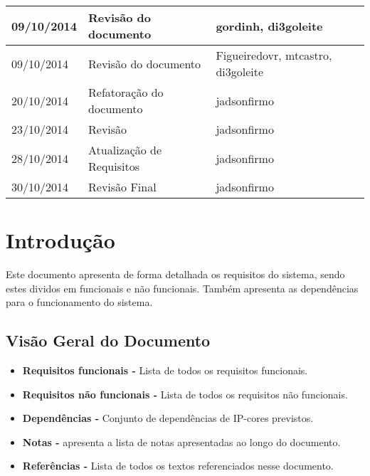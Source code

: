 \documentclass{article}
\begin{document}
\begin{table}[ht]
\begin{tabular}[pos]{|m{2cm} | m{7.2cm} | m{3.8cm}|}
      \small 09/10/2014 & \small Revisão do documento & \small gordinh, di3goleite \\ \hline
      \small 09/10/2014 & \small Revisão do documento & \small Figueiredovr, mtcastro, di3goleite \\ \hline
      \small 20/10/2014 & \small Refatoração do documento & \small jadsonfirmo \\ \hline
      \small 23/10/2014 & \small Revisão & \small jadsonfirmo \\ \hline
      \small 28/10/2014 & \small Atualização de Requisitos & \small jadsonfirmo \\ \hline
      \small 30/10/2014 & \small Revisão Final & \small jadsonfirmo \\ \hline
    \end{tabular}
  \end{table}

\newpage

\tableofcontents
\newpage

\section{Introdução}
	Este documento apresenta de forma detalhada os requisitos do sistema, sendo estes dividos em funcionais e não funcionais. Também apresenta as dependências para o funcionamento do sistema.

\subsection{Visão Geral do Documento}
  \begin{itemize}
   \item \textbf{Requisitos funcionais -} Lista de todos os requisitos funcionais.
   \item \textbf{Requisitos não funcionais -} Lista de todos os requisitos não funcionais.
   \item \textbf{Dependências -} Conjunto de dependências de IP-cores previstos.
   \item \textbf{Notas -} apresenta a lista de notas apresentadas ao longo do documento.
   \item \textbf{Referências -} Lista de todos os textos referenciados nesse documento.
  \end{itemize}

\end{document}
